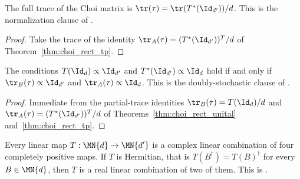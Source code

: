 \begin{theorem}
    \label{thm:choi_rect_normalization}
    \leanok
    The full trace of the Choi matrix is
    $\tr(\tau)=\tr(T^*(\Id_{d'}))/d$. This is the normalization clause of
    \cite[Proposition~2.1]{Wolf2012Quantum}.
\end{theorem}

\begin{proof}
    \leanok
    Take the trace of the identity
    $\tr_A(\tau)=(T^*(\Id_{d'}))^{T}/d$ of Theorem~\ref{thm:choi_rect_tp}.
\end{proof}

\begin{theorem}
    \label{thm:choi_rect_doubly_stochastic}
    \leanok
    The conditions $T(\Id_d)\propto\Id_{d'}$ and
    $T^*(\Id_{d'})\propto\Id_d$ hold if and only if
    $\tr_B(\tau)\propto\Id_{d'}$ and $\tr_A(\tau)\propto\Id_d$. This is the
    doubly-stochastic clause of \cite[Proposition~2.1]{Wolf2012Quantum}.
\end{theorem}

\begin{proof}
    \leanok
    Immediate from the partial-trace identities
    $\tr_B(\tau)=T(\Id_d)/d$ and $\tr_A(\tau)=(T^*(\Id_{d'}))^{T}/d$ of
    Theorems~\ref{thm:choi_rect_unital} and~\ref{thm:choi_rect_tp}.
\end{proof}

\begin{theorem}
    \label{thm:choi_rect_cp_decomposition}
    \leanok
    Every linear map $T:\MN{d}\to\MN{d'}$ is a complex linear combination of
    four completely positive maps. If $T$ is Hermitian, that is
    $T(B^\dagger)=T(B)^\dagger$ for every $B\in\MN{d}$, then $T$ is a real
    linear combination of two of them. This is
    \cite[Proposition~2.2]{Wolf2012Quantum}.
\end{theorem}

